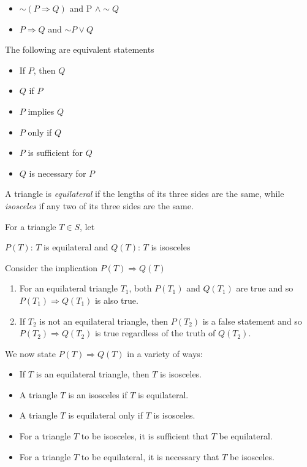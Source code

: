 \begin{itemize}
     \item $\sim (P \Rightarrow Q)$ and P $\wedge \sim Q$
     \item $P \Rightarrow Q$ and $\sim P \vee Q$
\end{itemize}

The following are equivalent statements
\begin{itemize}
     \item If $P$, then $Q$
     \item $Q$ if $P$
     \item $P$ implies $Q$
     \item $P$ only if $Q$
     \item $P$ is sufficient for $Q$
     \item $Q$ is necessary for $P$
\end{itemize}

\begin{eg}
     A triangle is \emph{equilateral} if the lengths of its three sides 
     are the same, while \emph{isosceles} if any two of its three sides 
     are the same.

     For a triangle $T \in S$, let 
     \begin{center}
          $P(T)$: $T$ is equilateral \qquad and \qquad $Q(T)$: $T$ is isosceles
     \end{center}
     Consider the implication $P(T) \Rightarrow Q(T)$
     \begin{enumerate}[label=(\roman*)]
          \item For an equilateral triangle $T_1$, both $P(T_1)$ and $Q(T_1)$
          are true and so  $P(T_1) \Rightarrow Q(T_1)$ is also true.
          \item If $T_2$ is not an equilateral triangle, then $P(T_2)$ is a 
          false statement and so $P(T_2) \Rightarrow Q(T_2)$ is true regardless
          of the truth of $Q(T_2)$.
     \end{enumerate}
     We now state $P(T) \Rightarrow Q(T)$ in a variety of ways:
     \begin{itemize}
        \item If $T$ is an equilateral triangle, then $T$ is isosceles.
        \item  A triangle $T$ is an isosceles if $T$ is equilateral.
        \item A triangle $T$ is equilateral only if $T$ is isosceles.
        \item For a triangle $T$ to be isosceles, it is sufficient that $T$ be equilateral.
        \item For a triangle $T$ to be equilateral, it is necessary that $T$ be isosceles.
     \end{itemize}
\end{eg}

